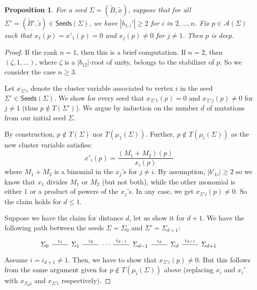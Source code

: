 \documentclass{amsart}
\newcommand{\seed}{\Sigma}
\newcommand{\exmatrix}[1]{\widetilde{#1}}
\newcommand{\var}{\mathcal{A}}
\newcommand{\seeds}{\mathsf{Seeds}}
\numberwithin{equation}{section}
\newtheorem{proposition}[theorem]{Proposition}
\theoremstyle{definition}
\begin{document}
\begin{proposition}\label{prop:so-may-deep}
For a seed $\seed  = (\exmatrix{B}, \exmatrix{x})$, suppose that for all $\seed' = (\exmatrix{B}', \exmatrix{z}) \in \seeds(\seed)$, we have $|b_{1,i}'| \geq 2$ for $i$ in $2, \dots, n$. 
Fix $p\in \var(\seed)$ such that $x_1(p) = x'_1(p)=0$ and $x_j(p) \neq 0$ for $j\neq1$. %
Then $p$ is deep. 
\end{proposition}


\begin{proof}
If the rank $n=1$, then this is a brief computation. %
If $n=2$, 
then $(\zeta, 1, \ldots)$, where $\zeta$ is a $|b_{12}|$-root of unity, belongs to the stabilizer of $p$.
So we consider the case $n \geq 3$. 

Let $x_{\seed'i}$ denote the cluster variable associated to vertex $i$ in the seed $\seed'\in\seeds(\seed)$. 
We show for every seed that $x_{\seed'1}(p)=0$ and $x_{\seed'j}(p) \neq 0$ for $j \neq 1$ (thus $p \not \in T(\seed')$). 
We argue by induction on the number $d$ of mutations from our initial seed $\seed$. 

By construction, $p\not \in T(\seed)$ nor $T(\mu_1(\seed))$.
Further, $p \not \in T(\mu_i(\seed))$ as the new cluster variable satisfies: \[
x'_{i}(p) = \frac{(M_1 + M_2)(p)}{x_{i}(p)}
\]
where $M_1 + M_2$ is a binomial in the $x_{j}$'s for $j \neq i$. 
By assumption, $|b'_{1i}|\geq 2$ so we know that $x_{1}$ divides $M_1$ or $M_2$ (but not both), while the other monomial is either $1$ or a product of powers of the $x_{j}$'s. In any case, we get $x_{\seed'i}(p) \neq 0$.
So the claim holds for $d\leq1$.

Suppose we have the claim for distance $d$, let us show it for $d+1$. 
We have the following path between the seeds $\seed = \seed_0$ and $\seed' = \seed_{d+1}$:
\[\begin{tikzcd}
	{\seed_0} & {\seed_1} & \cdots & {\seed_{d-1}} & {\seed_{d}} & {\seed_{d+1}}
	\arrow["{i_1}", no head, from=1-1, to=1-2]
	\arrow["{i_2}", no head, from=1-2, to=1-3]
	\arrow["{i_{d-1}}", no head, from=1-3, to=1-4]
	\arrow["{i_{d}}", no head, from=1-4, to=1-5]
	\arrow["{i_{d+1}}", no head, from=1-5, to=1-6]
\end{tikzcd}\]
Assume $i = i_{d+1} \neq 1$. Then, we have to show that $x_{\seed' i}(p) \neq 0$. But this follows from the same argument given for $p \not \in T(\mu_i(\seed))$ above (replacing $x_i$ and $x_i'$ with $x_{\seed_{d}i}$ and $x_{\seed'i}$ respectively). 


\end{proof}
\end{document}
